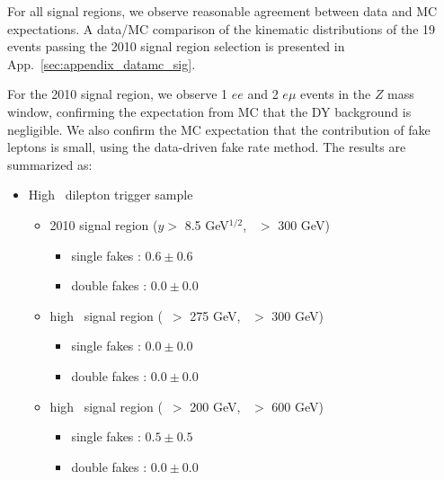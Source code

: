 For all signal regions, we observe reasonable agreement between data and MC expectations. 
A data/MC comparison of the kinematic distributions of the 19 events passing
the 2010 signal region selection is presented in App.~\ref{sec:appendix_datamc_sig}.

For the 2010 signal region, we observe 1 $ee$ and 2 $e\mu$ events in the $Z$ mass window,
confirming the expectation from MC that the DY background is negligible. We also confirm 
the MC expectation that the contribution of fake leptons is small, using the data-driven fake
rate method. The results are summarized as:

\begin{itemize}
\item High \pt\ dilepton trigger sample
\begin{itemize}
\item 2010 signal region ($y >$ 8.5 GeV$^{1/2}$, \Ht\ $>$ 300 GeV)
   \begin{itemize} 
   \item single fakes : $0.6 \pm 0.6$
   \item double fakes : $0.0 \pm 0.0$
   \end{itemize}  
\item high \met\ signal region (\met\ $>$ 275 GeV, \Ht\ $>$ 300 GeV)
   \begin{itemize} 
   \item single fakes : $0.0 \pm 0.0$
   \item double fakes : $0.0 \pm 0.0$
   \end{itemize}  
\item high \Ht\ signal region (\met\ $>$ 200 GeV, \Ht\ $>$ 600 GeV)
   \begin{itemize} 
   \item single fakes : $0.5 \pm 0.5$
   \item double fakes : $0.0 \pm 0.0$
   \end{itemize}  
\end{itemize}


\end{itemize}
